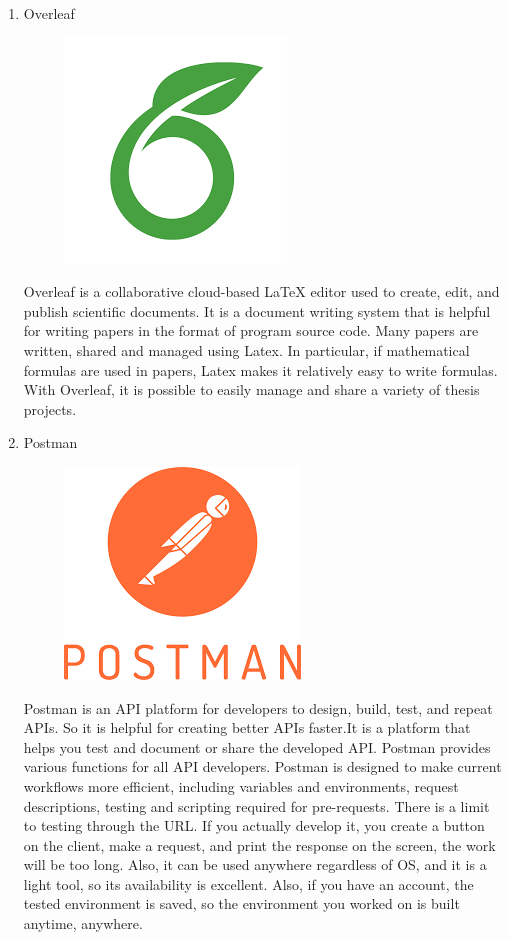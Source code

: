 \documentclass[conference]{IEEEtran}
\begin{document}
\begin{enumerate}
\begin{enumerate}
        \item Overleaf
        \begin{figure}[H]
                 \centering
                 \includegraphics[scale=0.3]{new_assets/overleaf-logo.png}
                 \end{figure}
        Overleaf is a collaborative cloud-based LaTeX editor used to create, edit, and publish scientific documents. It is a document writing system that is helpful for writing papers in the format of program source code. Many papers are written, shared and managed using Latex. In particular, if mathematical formulas are used in papers, Latex makes it relatively easy to write formulas. With Overleaf, it is possible to easily manage and share a variety of thesis projects.\\
        \item Postman
        \begin{figure}[H]
                 \centering
                 \includegraphics[scale=0.3]{new_assets/postman-logo.png}
                 \end{figure}
        Postman is an API platform for developers to design, build, test, and repeat APIs. So it is helpful for creating better APIs faster.It is a platform that helps you test and document or share the developed API. Postman provides various functions for all API developers. Postman is designed to make current workflows more efficient, including variables and environments, request descriptions, testing and scripting required for pre-requests. There is a limit to testing through the URL. If you actually develop it, you create a button on the client, make a request, and print the response on the screen, the work will be too long. Also, it can be used anywhere regardless of OS, and it is a light tool, so its availability is excellent. Also, if you have an account, the tested environment is saved, so the environment you worked on is built anytime, anywhere.\\

\end{enumerate}
\end{enumerate}
\end{document}
